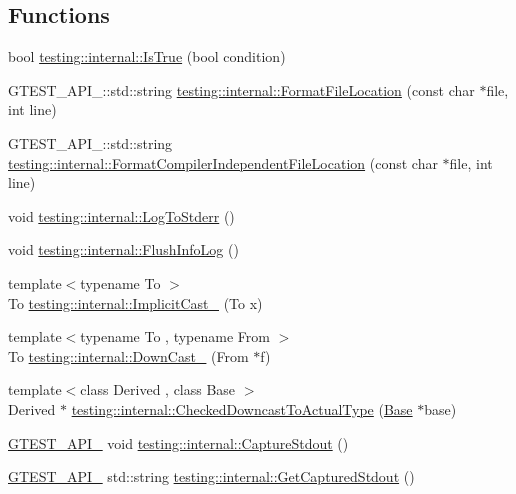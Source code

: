 \subsection*{Functions}
\begin{DoxyCompactItemize}
\item 
bool \hyperlink{namespacetesting_1_1internal_a527b9bcc13669b9a16400c8514266254}{testing\-::internal\-::\-Is\-True} (bool condition)
\item 
G\-T\-E\-S\-T\-\_\-\-A\-P\-I\-\_\-\-::std\-::string \hyperlink{namespacetesting_1_1internal_a31b7c3abed4a7c395f42c61e993989f4}{testing\-::internal\-::\-Format\-File\-Location} (const char $\ast$file, int line)
\item 
G\-T\-E\-S\-T\-\_\-\-A\-P\-I\-\_\-\-::std\-::string \hyperlink{namespacetesting_1_1internal_a1ee4cde97868c53e442d3182496a9f3c}{testing\-::internal\-::\-Format\-Compiler\-Independent\-File\-Location} (const char $\ast$file, int line)
\item 
void \hyperlink{namespacetesting_1_1internal_a06b1b20029fbd1dbeb59752f914fab84}{testing\-::internal\-::\-Log\-To\-Stderr} ()
\item 
void \hyperlink{namespacetesting_1_1internal_a2135f223bf6b527729aeaa651115183b}{testing\-::internal\-::\-Flush\-Info\-Log} ()
\item 
{\footnotesize template$<$typename To $>$ }\\To \hyperlink{namespacetesting_1_1internal_a982df3f369643b175f79cda4048bc3b9}{testing\-::internal\-::\-Implicit\-Cast\-\_\-} (To x)
\item 
{\footnotesize template$<$typename To , typename From $>$ }\\To \hyperlink{namespacetesting_1_1internal_a1a1a1aed3fe00908b8a45d5ab4a33665}{testing\-::internal\-::\-Down\-Cast\-\_\-} (From $\ast$f)
\item 
{\footnotesize template$<$class Derived , class Base $>$ }\\Derived $\ast$ \hyperlink{namespacetesting_1_1internal_af54f5cf4d9e03836ecc0316d090cb4ed}{testing\-::internal\-::\-Checked\-Downcast\-To\-Actual\-Type} (\hyperlink{class_base}{Base} $\ast$base)
\item 
\hyperlink{gtest-port_8h_aa73be6f0ba4a7456180a94904ce17790}{G\-T\-E\-S\-T\-\_\-\-A\-P\-I\-\_\-} void \hyperlink{namespacetesting_1_1internal_acba06d4f0343dec407738ba5544af990}{testing\-::internal\-::\-Capture\-Stdout} ()
\item 
\hyperlink{gtest-port_8h_aa73be6f0ba4a7456180a94904ce17790}{G\-T\-E\-S\-T\-\_\-\-A\-P\-I\-\_\-} std\-::string \hyperlink{namespacetesting_1_1internal_aed657219a9856a8d249a3230de0c54ce}{testing\-::internal\-::\-Get\-Captured\-Stdout} ()

\end{DoxyCompactItemize}
